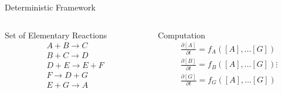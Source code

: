 \documentclass{beamer}
\begin{document}
\begin{frame}{Deterministic Framework}
  \begin{columns}
    \begin{column}{.45 \textwidth}
      \begin{block}{Set of Elementary Reactions}
        \begin{equation*}
          \begin{gathered}
            A + B \rightarrow C \\
            B + C \rightarrow D \\
            D + E \rightarrow E + F \\
            F \rightarrow D + G \\
            E + G \rightarrow A   
          \end{gathered}
        \end{equation*}
      \end{block}
    \end{column}
    \begin{column}{.45 \textwidth}
      \begin{block}{Computation}
        \begin{equation*}
          \begin{gathered}
            \frac{\partial [A]}{\partial t} = f_A\left([A], \dots [G]\right) \\
            \frac{\partial [B]}{\partial t} = f_B\left([A], \dots [G]\right) 
            \vdots\\
            \frac{\partial [G]}{\partial t} = f_G\left([A], \dots [G]\right)
          \end{gathered}
        \end{equation*}
      \end{block}
    \end{column}
  \end{columns}
\end{frame}
\end{document}
